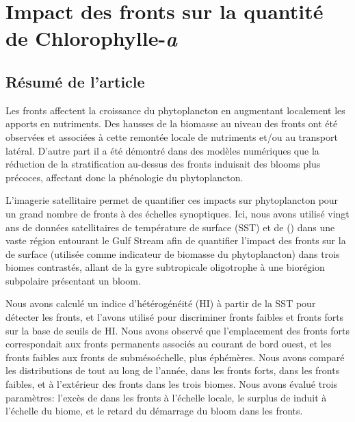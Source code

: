 
\chapter{Impact des fronts sur la quantité de Chlorophylle-\textit{a}}
\addChpLof
\label{chp:res-chl}
\graphicspath{{resources/res_chl}}

{
  \hypersetup{hidelinks}
  \minitoc%
}



\section{Résumé de l'article}
\label{sec:resume-article}

Les fronts affectent la croissance du phytoplancton en augmentant localement les apports en nutriments.
Des hausses de la biomasse au niveau des fronts ont été observées et associées à cette remontée locale de nutriments et/ou au transport latéral.
D'autre part il a été démontré dans des modèles numériques que la réduction de la stratification au-dessus des fronts induisait des blooms plus précoces, affectant donc la phénologie du phytoplancton.

L'imagerie satellitaire permet de quantifier ces impacts sur phytoplancton pour un grand nombre de fronts à des échelles synoptiques.
Ici, nous avons utilisé vingt ans de données satellitaires de température de surface (SST) et de  () dans une vaste région entourant le Gulf Stream afin de quantifier l'impact des fronts sur la  de surface (utilisée comme indicateur de biomasse du phytoplancton) dans trois biomes contrastés, allant de la gyre subtropicale oligotrophe à une biorégion subpolaire présentant un bloom.

Nous avons calculé un indice d'hétérogénéité (HI) à partir de la SST pour détecter les fronts, et l'avons utilisé pour discriminer fronts faibles et fronts forts sur la base de seuils de HI.
Nous avons observé que l'emplacement des fronts forts correspondait aux fronts permanents associés au courant de bord ouest, et les fronts faibles aux fronts de submésoéchelle, plus éphémères.
Nous avons comparé les distributions de  tout au long de l'année, dans les fronts forts, dans les fronts faibles, et à l'extérieur des fronts dans les trois biomes.
Nous avons évalué trois paramètres: l'excès de  dans les fronts à l'échelle locale, le surplus de  induit à l'échelle du biome, et le retard du démarrage du bloom dans les fronts.

